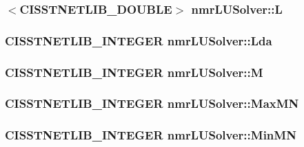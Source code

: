 \hypertarget{classnmr_l_u_solver_aaf0f1fb37af9ab5edff6fcb7f8244de4}{
\subsubsection[{L}]{$<$C\-I\-S\-S\-T\-N\-E\-T\-L\-I\-B\-\_\-\-D\-O\-U\-B\-L\-E$>$ nmr\-L\-U\-Solver\-::\-L\hspace{0.3cm}{\ttfamily [protected]}}}\label{classnmr_l_u_solver_aaf0f1fb37af9ab5edff6fcb7f8244de4}
\hypertarget{classnmr_l_u_solver_a11c2f5c7c596efaaa06b6f8df190b0c6}{
\subsubsection[{Lda}]{\setlength{\rightskip}{0pt plus 5cm}C\-I\-S\-S\-T\-N\-E\-T\-L\-I\-B\-\_\-\-I\-N\-T\-E\-G\-E\-R nmr\-L\-U\-Solver\-::\-Lda\hspace{0.3cm}{\ttfamily [protected]}}}\label{classnmr_l_u_solver_a11c2f5c7c596efaaa06b6f8df190b0c6}
\hypertarget{classnmr_l_u_solver_ac73ea71a8da30d187017a98e2bcb0e51}{
\subsubsection[{M}]{\setlength{\rightskip}{0pt plus 5cm}C\-I\-S\-S\-T\-N\-E\-T\-L\-I\-B\-\_\-\-I\-N\-T\-E\-G\-E\-R nmr\-L\-U\-Solver\-::\-M\hspace{0.3cm}{\ttfamily [protected]}}}\label{classnmr_l_u_solver_ac73ea71a8da30d187017a98e2bcb0e51}
\hypertarget{classnmr_l_u_solver_ac59a365a23fdd52c40d4076efc5f0944}{
\subsubsection[{Max\-M\-N}]{\setlength{\rightskip}{0pt plus 5cm}C\-I\-S\-S\-T\-N\-E\-T\-L\-I\-B\-\_\-\-I\-N\-T\-E\-G\-E\-R nmr\-L\-U\-Solver\-::\-Max\-M\-N\hspace{0.3cm}{\ttfamily [protected]}}}\label{classnmr_l_u_solver_ac59a365a23fdd52c40d4076efc5f0944}
\hypertarget{classnmr_l_u_solver_aeeaab59323aae5580e166a6ad23e75d2}{
\subsubsection[{Min\-M\-N}]{\setlength{\rightskip}{0pt plus 5cm}C\-I\-S\-S\-T\-N\-E\-T\-L\-I\-B\-\_\-\-I\-N\-T\-E\-G\-E\-R nmr\-L\-U\-Solver\-::\-Min\-M\-N\hspace{0.3cm}{\ttfamily [protected]}}}\label{classnmr_l_u_solver_aeeaab59323aae5580e166a6ad23e75d2}
